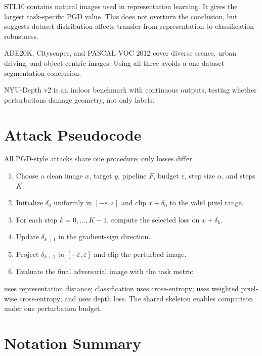 STL10 contains natural images used in representation learning. It gives \DeACL the largest task-specific PGD value. This does not overturn the conclusion, but suggests dataset distribution affects transfer from representation to classification robustness.

ADE20K, Cityscapes, and PASCAL VOC 2012 cover diverse scenes, urban driving, and object-centric images. Using all three avoids a one-dataset segmentation conclusion.

NYU-Depth v2 is an indoor benchmark with continuous outputs, testing whether perturbations damage geometry, not only labels.

\section{Attack Pseudocode}
\label{sec:attack-pseudocode}

All PGD-style attacks share one procedure; only losses differ.

\begin{enumerate}[wide]
    \item Choose a clean image $x$, target $y$, pipeline $F$, budget $\varepsilon$, step size $\alpha$, and steps $K$.
    \item Initialize $\delta_0$ uniformly in $[-\varepsilon,\varepsilon]$ and clip $x+\delta_0$ to the valid pixel range.
    \item For each step $k=0,\ldots,K-1$, compute the selected loss on $x+\delta_k$.
    \item Update $\delta_{k+1}$ in the gradient-sign direction.
    \item Project $\delta_{k+1}$ to $[-\varepsilon,\varepsilon]$ and clip the perturbed image.
    \item Evaluate the final adversarial image with the task metric.
\end{enumerate}

\EmbedAttack uses representation distance; classification \PGD uses cross-entropy; \SegPGD uses weighted pixel-wise cross-entropy; and \DepthPGD uses depth loss. The shared skeleton enables comparison under one perturbation budget.

\section{Notation Summary}
\label{sec:notation}

